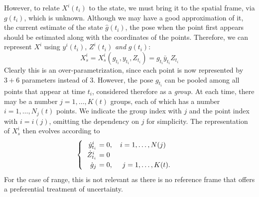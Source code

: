 However, to relate $X^i(t_i)$ to the state, we must bring it to the spatial frame, via $g(t_i)$, which is unknown. Although we may have a good approximation of it, the current estimate of the state $\hat g(t_i)$, the pose when the point first appears should be estimated along with the coordinates of the points. Therefore, we can represent $X^i$ using $y^i(t_i)$, $Z^i(t_i)$ {\em and} $g(t_i)$: 
\begin{equation}
X_s^i = X_s^i(g_{t_i}, y_{t_i}, Z_{t_i}) = g_{t_i} \bar y_{t_i} Z_{t_i}
\end{equation}
Clearly this is an over-parametrization, since each point is now represented by $3+6$ parameters instead of $3$. However, the pose $g_{t_i}$ can be pooled among all points that appear at time $t_i$, considered therefore as a {\em group}. At each time, there may be a number $j = 1, \dots, K(t)$ groups, each of which has a number $i = 1, \dots, N_j(t)$ points. We indicate the group index with $j$ and the point index with $i = i(j)$, omitting the dependency on $j$ for simplicity. The representation of $X_s^i$ then evolves according to
\begin{equation}
\begin{cases}
\begin{tabular}{>{$}r<{$} >{$\!\!\!\!\!}l<{$}}
\dot y^i_{t_i} &= 0, ~~~ i = 1, \dots, N(j) \\
\dot Z^i_{t_i} &= 0 \\
\dot g_{j} &= 0, ~~~~ j = 1, \dots, K(t).
\end{tabular}
\end{cases}
\end{equation}
For the case of range, this is not relevant as there is no reference frame that offers a preferential treatment of uncertainty.



